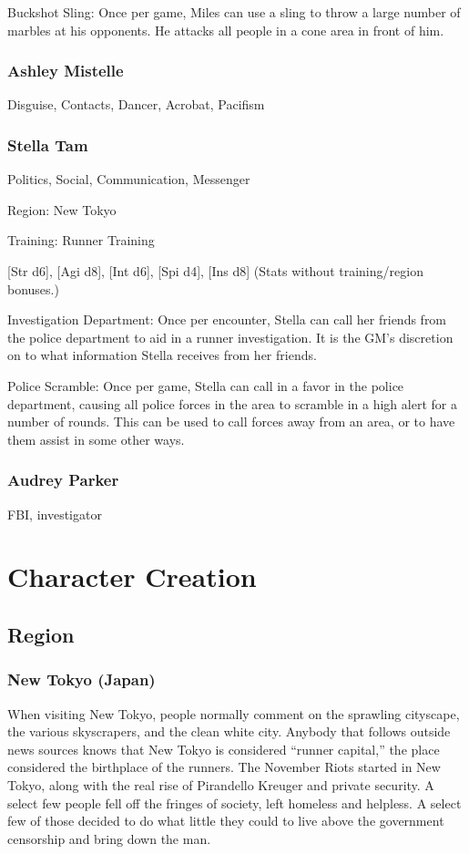 \documentclass{article}
\begin{document}
\begin{multicols}{2}
Buckshot Sling: Once per game, Miles can use a sling to throw a large number of marbles at his opponents. He attacks all people in a cone area in front of him.
\subsubsection{Ashley Mistelle}
Disguise, Contacts, Dancer, Acrobat, Pacifism
\subsubsection{Stella Tam}
Politics, Social, Communication, Messenger

Region: New Tokyo

Training: Runner Training

[Str d6], [Agi d8], [Int d6], [Spi d4], [Ins d8] (Stats without training/region bonuses.)

Investigation Department: Once per encounter, Stella can call her friends from the police department to aid in a runner investigation. It is the GM’s discretion on to what information Stella receives from her friends.

Police Scramble: Once per game, Stella can call in a favor in the police department, causing all police forces in the area to scramble in a high alert for a number of rounds. This can be used to call forces away from an area, or to have them assist in some other ways.

\subsubsection{Audrey Parker}
FBI, investigator

\section{Character Creation}
\subsection{Region}

\subsubsection{New Tokyo (Japan)}
When visiting New Tokyo, people normally comment on the sprawling cityscape, the various skyscrapers, and the clean white city. Anybody that follows outside news sources knows that New Tokyo is considered “runner capital,” the place considered the birthplace of the runners. The November Riots started in New Tokyo, along with the real rise of Pirandello Kreuger and private security. A select few people fell off the fringes of society, left homeless and helpless. A select few of those decided to do what little they could to live above the government censorship and bring down the man.


\end{multicols}
\end{document}
